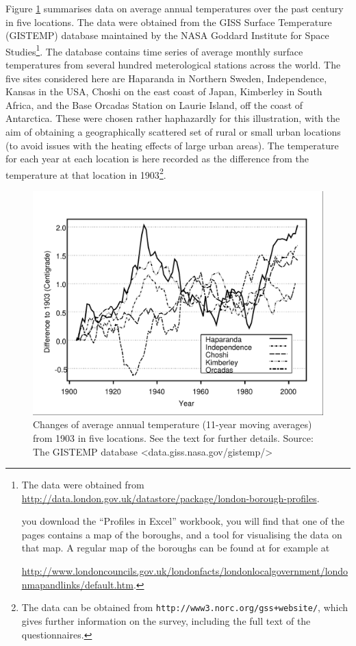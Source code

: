 \documentclass[11pt,a4paper,openany]{book}
\let\rmarkdownfootnote\footnote%
\def\footnote{\protect\rmarkdownfootnote}
\begin{document}
Figure \ref{fig:f-temperatures} summarises data on average annual
temperatures over the past century in five locations. The data were
obtained from the GISS Surface Temperature (GISTEMP) database maintained
by the NASA Goddard Institute for Space Studies\footnote{The data were
  obtained from
  \url{http://data.london.gov.uk/datastore/package/london-borough-profiles}.

  \noindentIf you download the ``Profiles in Excel'' workbook, you will
  find that one of the pages contains a map of the boroughs, and a tool
  for visualising the data on that map. A regular map of the boroughs
  can be found at for example at

  \url{http://www.londoncouncils.gov.uk/londonfacts/londonlocalgovernment/londonmapandlinks/default.htm}.}.
The database contains time series of average monthly surface
temperatures from several hundred meterological stations across the
world. The five sites considered here are Haparanda in Northern Sweden,
Independence, Kansas in the USA, Choshi on the east coast of Japan,
Kimberley in South Africa, and the Base Orcadas Station on Laurie
Island, off the coast of Antarctica. These were chosen rather
haphazardly for this illustration, with the aim of obtaining a
geographically scattered set of rural or small urban locations (to avoid
issues with the heating effects of large urban areas). The temperature
for each year at each location is here recorded as the difference from
the temperature at that location in 1903\footnote{The data can be
  obtained from \texttt{http://www3.norc.org/gss+website/}, which gives
  further information on the survey, including the full text of the
  questionnaires.}.

\begin{figure}[htbp]
\centering
\includegraphics[width=13.00000cm]{temperplot.pdf}
\caption{\label{fig:f-temperatures} Changes of average annual temperature
(11-year moving averages) from 1903 in five locations. See the text for
further details. Source: The GISTEMP database
\textless{}data.giss.nasa.gov/gistemp/\textgreater{}}
\end{figure}
\end{document}
